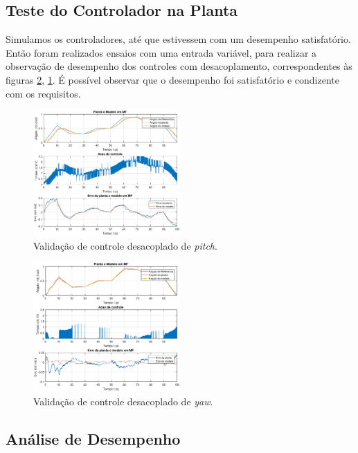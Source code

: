 
\subsection{\textbf{Teste do Controlador na Planta}}

Simulamos os controladores, até que estivessem com um desempenho satisfatório. Então foram realizados ensaios com uma entrada variável, para realizar a observação de desempenho dos controles com desacoplamento, correspondentes às figuras \ref{fig:ResultadosYaw}, \ref{fig:ResultadosPitch}.
É possível observar que o desempenho foi satisfatório e condizente com os requisitos.

\begin{figure}[H]
    \centering
    \includegraphics[width=0.5\textwidth]{figures/resultados/valida_pitch.eps}
    \caption{Validação de controle desacoplado de  \textit{pitch}.}
    \label{fig:ResultadosPitch}
\end{figure}

\begin{figure}[H]
    \centering
    \includegraphics[width=0.5\textwidth]{figures/resultados/valida_yaw.eps}
    \caption{Validação de controle desacoplado de  \textit{yaw}.}
    \label{fig:ResultadosYaw}
\end{figure}


\subsection{\textbf{Análise de Desempenho}}

